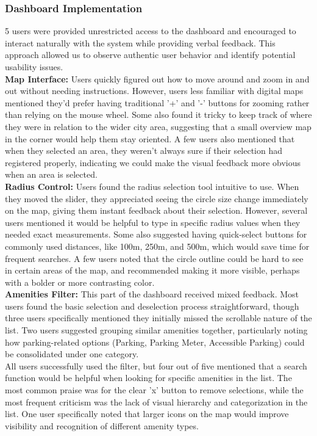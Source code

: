 \documentclass{report}
\begin{document}
\subsubsection{Dashboard Implementation}
5 users were provided unrestricted access to the dashboard and encouraged to interact naturally with the system while providing verbal feedback. This approach allowed us to observe authentic user behavior and identify potential usability issues.\\

\textbf{Map Interface: }
Users quickly figured out how to move around and zoom in and out without needing instructions. However, users less familiar with digital maps mentioned they'd prefer having traditional '+' and '-' buttons for zooming rather than relying on the mouse wheel. Some also found it tricky to keep track of where they were in relation to the wider city area, suggesting that a small overview map in the corner would help them stay oriented. A few users also mentioned that when they selected an area, they weren't always sure if their selection had registered properly, indicating we could make the visual feedback more obvious when an area is selected.\\

\textbf{Radius Control: }
Users found the radius selection tool intuitive to use. When they moved the slider, they appreciated seeing the circle size change immediately on the map, giving them instant feedback about their selection. However, several users mentioned it would be helpful to type in specific radius values when they needed exact measurements. Some also suggested having quick-select buttons for commonly used distances, like 100m, 250m, and 500m, which would save time for frequent searches. A few users noted that the circle outline could be hard to see in certain areas of the map, and recommended making it more visible, perhaps with a bolder or more contrasting color.\\

\textbf{Amenities Filter: }
This part of the dashboard received mixed feedback. Most users found the basic selection and deselection process straightforward, though three users specifically mentioned they initially missed the scrollable nature of the list. Two users suggested grouping similar amenities together, particularly noting how parking-related options (Parking, Parking Meter, Accessible Parking) could be consolidated under one category.\\ All users successfully used the filter, but four out of five mentioned that a search function would be helpful when looking for specific amenities in the list. The most common praise was for the clear 'x' button to remove selections, while the most frequent criticism was the lack of visual hierarchy and categorization in the list. One user specifically noted that larger icons on the map would improve visibility and recognition of different amenity types.\\
\end{document}
